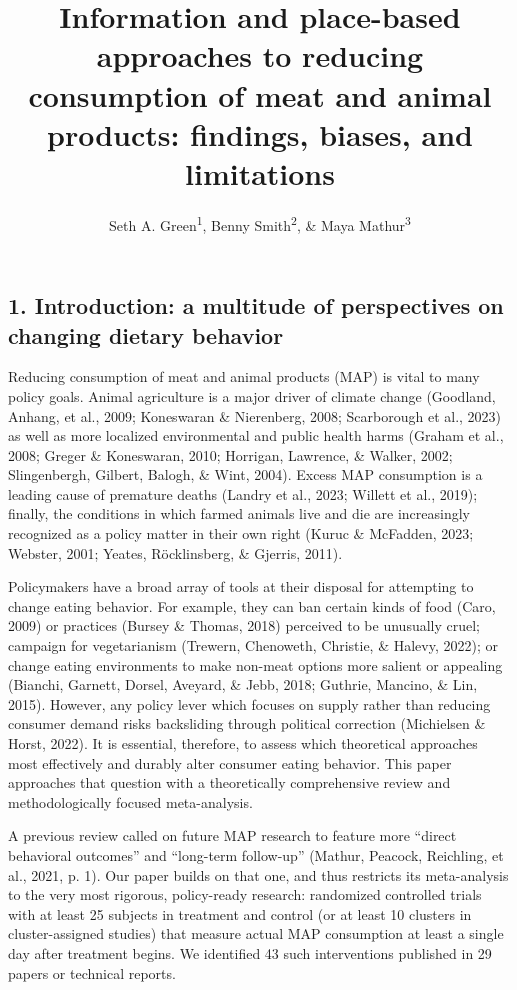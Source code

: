 \documentclass[
  man]{apa6}
\title{Information and place-based approaches to reducing consumption of meat and animal products: findings, biases, and limitations}
\author{Seth A. Green\textsuperscript{1}, Benny Smith\textsuperscript{2}, \& Maya Mathur\textsuperscript{3}}
\date{}
\affiliation{\vspace{0.5cm}\textsuperscript{1} Kahneman-Treisman Center, Princeton University\\\textsuperscript{2} Allied Scholars for Animal Protection\\\textsuperscript{3} Stanford University}
\begin{document}
\maketitle

\subsection{1. Introduction: a multitude of perspectives on changing dietary behavior}\label{introduction-a-multitude-of-perspectives-on-changing-dietary-behavior}

Reducing consumption of meat and animal products (MAP) is vital to many policy goals. Animal agriculture is a major driver of climate change (Goodland, Anhang, et al., 2009; Koneswaran \& Nierenberg, 2008; Scarborough et al., 2023) as well as more localized environmental and public health harms (Graham et al., 2008; Greger \& Koneswaran, 2010; Horrigan, Lawrence, \& Walker, 2002; Slingenbergh, Gilbert, Balogh, \& Wint, 2004). Excess MAP consumption is a leading cause of premature deaths (Landry et al., 2023; Willett et al., 2019); finally, the conditions in which farmed animals live and die are increasingly recognized as a policy matter in their own right (Kuruc \& McFadden, 2023; Webster, 2001; Yeates, Röcklinsberg, \& Gjerris, 2011).

Policymakers have a broad array of tools at their disposal for attempting to change eating behavior. For example, they can ban certain kinds of food (Caro, 2009) or practices (Bursey \& Thomas, 2018) perceived to be unusually cruel; campaign for vegetarianism (Trewern, Chenoweth, Christie, \& Halevy, 2022); or change eating environments to make non-meat options more salient or appealing (Bianchi, Garnett, Dorsel, Aveyard, \& Jebb, 2018; Guthrie, Mancino, \& Lin, 2015). However, any policy lever which focuses on supply rather than reducing consumer demand risks backsliding through political correction (Michielsen \& Horst, 2022). It is essential, therefore, to assess which theoretical approaches most effectively and durably alter consumer eating behavior. This paper approaches that question with a theoretically comprehensive review and methodologically focused meta-analysis.

A previous review called on future MAP research to feature more ``direct behavioral outcomes'' and ``long-term follow-up'' (Mathur, Peacock, Reichling, et al., 2021, p. 1). Our paper builds on that one, and thus restricts its meta-analysis to the very most rigorous, policy-ready research: randomized controlled trials with at least 25 subjects in treatment and control (or at least 10 clusters in cluster-assigned studies) that measure actual MAP consumption at least a single day after treatment begins. We identified 43 such interventions published in 29 papers or technical reports.
\end{document}

